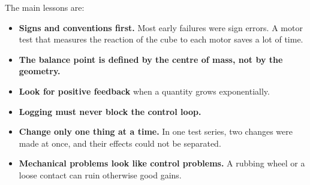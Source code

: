 The main lessons are:
\begin{itemize}
  \item \textbf{Signs and conventions first.} Most early failures were sign errors. A motor test
        that measures the reaction of the cube to each motor saves a lot of time.
  \item \textbf{The balance point is defined by the centre of mass, not by the geometry.}
  \item \textbf{Look for positive feedback} when a quantity grows exponentially.
  \item \textbf{Logging must never block the control loop.}
  \item \textbf{Change only one thing at a time.} In one test series, two changes were made at
        once, and their effects could not be separated.
  \item \textbf{Mechanical problems look like control problems.} A rubbing wheel or a loose
        contact can ruin otherwise good gains.
\end{itemize}
